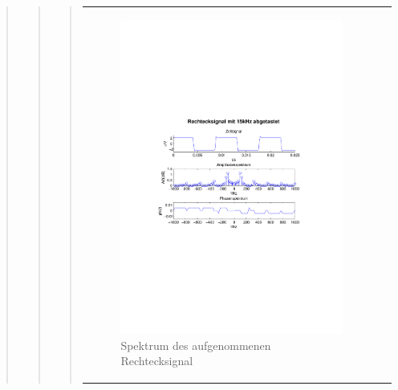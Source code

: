\begin{quote}
\begin{quote}
\begin{quote}
\begin{center}
\begin{tabular}{ll}
\begin{minipage}{0.6\textwidth}
                        \begin{figure}[H]
                            \label{fig:}
                            \includegraphics[scale=0.65, trim = 3cm 9cm 3cm
                            8.5cm, clip]{./Bilder/6_2_rechteck_15kHz}
                            \caption{Spektrum des aufgenommenen Rechtecksignal}
                        \end{figure}
    
                    \end{minipage}
                    \begin{minipage}{0.6\textwidth}
    

\end{minipage}
\end{tabular}
\end{center}
\end{quote}
\end{quote}
\end{quote}
